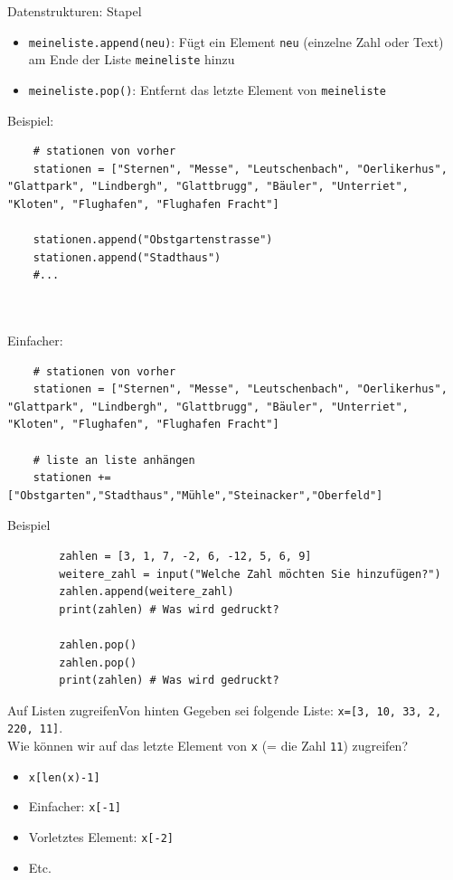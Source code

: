 \begin{frame}[fragile]{Datenstrukturen: Stapel }
	\begin{itemize}
		\item \lstinline|meineliste.append(neu)|: Fügt ein Element \lstinline|neu| (einzelne Zahl oder Text) am Ende der Liste \lstinline|meineliste| hinzu
		\item \lstinline|meineliste.pop()|: Entfernt das letzte Element von \lstinline|meineliste|
	\end{itemize}
	\pause
	Beispiel:
	\begin{lstlisting}
	# stationen von vorher
	stationen = ["Sternen", "Messe", "Leutschenbach", "Oerlikerhus", "Glattpark", "Lindbergh", "Glattbrugg", "Bäuler", "Unterriet", "Kloten", "Flughafen", "Flughafen Fracht"]
	
	stationen.append("Obstgartenstrasse")
	stationen.append("Stadthaus")
	#...
	
	
	\end{lstlisting}
	\pause
	Einfacher:
	\begin{lstlisting}
	# stationen von vorher
	stationen = ["Sternen", "Messe", "Leutschenbach", "Oerlikerhus", "Glattpark", "Lindbergh", "Glattbrugg", "Bäuler", "Unterriet", "Kloten", "Flughafen", "Flughafen Fracht"]
	
	# liste an liste anhängen
	stationen += ["Obstgarten","Stadthaus","Mühle","Steinacker","Oberfeld"]
	\end{lstlisting}
\end{frame}

\begin{frame}[fragile]{Beispiel}
	\begin{lstlisting}
		zahlen = [3, 1, 7, -2, 6, -12, 5, 6, 9]
		weitere_zahl = input("Welche Zahl möchten Sie hinzufügen?")
		zahlen.append(weitere_zahl)
		print(zahlen) # Was wird gedruckt?
		
		zahlen.pop()
		zahlen.pop()
		print(zahlen) # Was wird gedruckt?
	\end{lstlisting}
\end{frame}

\begin{frame}[fragile]{Auf Listen zugreifen}{Von hinten}
Gegeben sei folgende Liste: \lstinline|x=[3, 10, 33, 2, 220, 11]|.\\

Wie können wir auf das letzte Element von \lstinline|x| (= die Zahl \lstinline|11|) zugreifen?
\begin{itemize}
\item \lstinline|x[len(x)-1]|
\item Einfacher: \lstinline|x[-1]|
\item Vorletztes Element: \lstinline|x[-2]|
\item Etc.
\end{itemize}
\end{frame}

